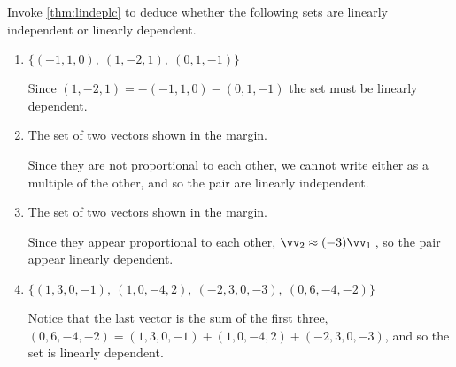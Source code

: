 \begin{example} \label{eg:}
Invoke \autoref{thm:lindeplc} to deduce whether the following sets are linearly independent or linearly dependent.
\begin{enumerate}
\item \(\{(-1,1,0),\ (1,-2,1),\ (0,1,-1)\}\)
\begin{solution} 
Since \((1,-2,1)=-(-1,1,0)-(0,1,-1)\) the set must be linearly dependent.
\end{solution}

\item The set of two vectors shown in the margin.
\begin{solution} 
Since they are not proportional to each other, we cannot write either as a multiple of the other, and so the pair are linearly independent. 
\end{solution}

\item The set of two vectors shown in the margin.
\begin{solution} 
Since they appear proportional to each other, \(\vv_2\approx (-3)\vv_1\)\,,  so the pair appear linearly dependent. 
\end{solution}

\item \(\{(1,3,0,-1),\ (1,0,-4,2),\ (-2,3,0,-3),\ (0,6,-4,-2)\}\)
\begin{solution} 
Notice that the last vector is the sum of the first three, \((0,6,-4,-2)=(1,3,0,-1)+(1,0,-4,2)+(-2,3,0,-3)\), and so the set is linearly dependent. 
\end{solution}

\end{enumerate}
\end{example}




